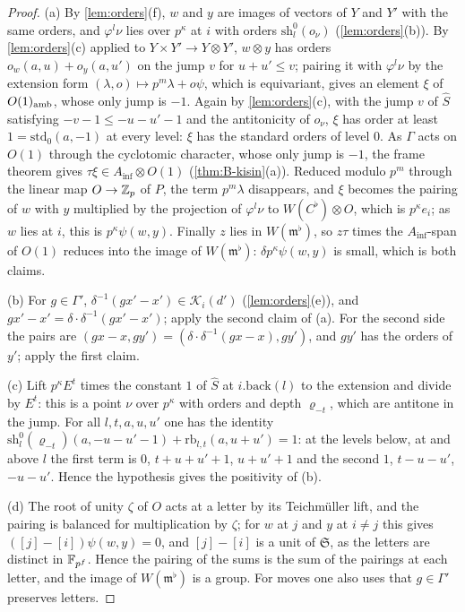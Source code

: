 \begin{proof}
(a) By \cref{lem:orders}(f), $w$ and $y$ are images of vectors of $Y$ and $Y'$ with the same orders, and $\varphi^l\nu$ lies over $p^\kappa$ at $i$ with orders $\mathrm{sh}^0_l(o_\nu)$ (\cref{lem:orders}(b)). By \cref{lem:orders}(c) applied to $Y\times Y'\to Y\otimes Y'$, $w\otimes y$ has orders
$o_w(a,u)+o_y(a,u')$ on the jump $v$ for $u+u'\le v$; pairing it with $\varphi^l\nu$ by the extension form $(\lambda,o)\mapsto p^m\lambda+o\psi$, which is equivariant, gives an element $\xi$ of $O(1)_{\rm amb}$, whose only jump is $-1$. Again by \cref{lem:orders}(c), with the jump $v$ of $\hat S$ satisfying
$-v-1\le-u-u'-1$ and the antitonicity of $o_\nu$, $\xi$ has order at least $1=\mathrm{std}_0(a,-1)$ at every level: $\xi$ has the standard orders of level $0$. As $\Gamma$ acts on $O(1)$ through the cyclotomic character, whose only jump is $-1$, the frame theorem gives $\tau\xi\in A_{\inf}\otimes O(1)$
(\cref{thm:B-kisin}(a)). Reduced modulo $p^m$ through the linear map $O\to\mathbb{Z}_p$ of $P$, the term $p^m\lambda$ disappears, and $\xi$ becomes the pairing of $w$ with $y$ multiplied by the projection of $\varphi^l\nu$ to $W(C^\flat)\otimes O$, which is $p^\kappa e_i$; as $w$ lies at $i$, this is
$p^\kappa\psi(w,y)$. Finally $z$ lies in $W(\mathfrak m^\flat)$, so $z\tau$ times the $A_{\inf}$-span of $O(1)$ reduces into the image of $W(\mathfrak m^\flat)$: $\delta p^\kappa\psi(w,y)$ is small, which is both claims.

(b) For $g\in\Gamma'$, $\delta^{-1}(gx'-x')\in\mathcal K_i(d')$ (\cref{lem:orders}(e)), and $gx'-x'=\delta\cdot\delta^{-1}(gx'-x')$; apply the second claim of (a). For the second side the pairs are $(gx-x,gy')=(\delta\cdot\delta^{-1}(gx-x),gy')$, and $gy'$ has the orders of $y'$; apply the first claim.

(c) Lift $p^\kappa E^t$ times the constant $1$ of $\hat S$ at $i.\mathrm{back}(l)$ to the extension and divide by $E^t$: this is a point $\nu$ over $p^\kappa$ with orders and depth $\varrho_{-t}$, which are antitone in the jump. For all $l,t,a,u,u'$ one has the identity
$\mathrm{sh}^0_l(\varrho_{-t})(a,-u-u'-1)+\mathrm{rb}_{l,t}(a,u+u')=1$: at the levels below, at and above $l$ the first term is $0$, $t+u+u'+1$, $u+u'+1$ and the second $1$, $t-u-u'$, $-u-u'$. Hence the hypothesis gives the positivity of (b).

(d) The root of unity $\zeta$ of $O$ acts at a letter by its Teichm\"uller lift, and the pairing is balanced for multiplication by $\zeta$; for $w$ at $j$ and $y$ at $i\ne j$ this gives $([j]-[i])\psi(w,y)=0$, and $[j]-[i]$ is a unit of $\mathfrak S$, as the letters are distinct in $\mathbb{F}_{p^f}$. Hence the
pairing of the sums is the sum of the pairings at each letter, and the image of $W(\mathfrak m^\flat)$ is a group. For moves one also uses that $g\in\Gamma'$ preserves letters.
\end{proof}

